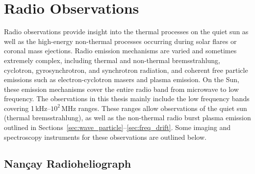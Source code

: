 \section{Radio Observations}\label{sec:3}

Radio observations provide insight into the thermal processes on the quiet sun as well as the high-energy non-thermal processes occurring during solar flares or coronal mass ejections. Radio emission mechanisms are varied and sometimes extremely complex, including thermal and non-thermal bremsstrahlung, cyclotron, gyrosynchrotron, and synchrotron radiation, and coherent free particle emissions such as electron-cyclotron masers and plasma emission. On the Sun, these emission mechanisms cover the entire radio band from microwave to low frequency. The observations in this thesis mainly include the low frequency bands covering 1\,kHz--$10^2$\,MHz ranges. These ranges allow observations of the quiet sun (thermal bremsstrahlung), as well as the non-thermal radio burst plasma emission outlined in Sections~\ref{sec:wave_particle}--\ref{sec:freq_drift}. Some imaging and spectroscopy instruments for these observations are outlined below.


\subsection{Nan\c{c}ay Radioheliograph}\label{sec:33}

